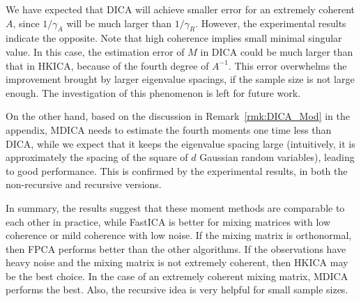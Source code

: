 \documentclass[jmlr]{article}
\theoremstyle{definition}
\begin{document}
We have expected that DICA will achieve smaller error for an extremely coherent $A$, since $1/\gamma_A$ will be much larger than $1/\gamma_R$. 
However, the experimental results indicate the opposite. 
Note that high coherence implies small minimal singular value.
In this case, the estimation error of $M$ in DICA could be much larger than that in HKICA, because of the fourth degree of $A^{-1}$.
This error overwhelms the improvement brought by larger eigenvalue
spacings, if the sample size is not large enough.
The investigation of this phenomenon is left for future work.

On the other hand, based on the discussion in Remark~\ref{rmk:DICA_Mod} in the appendix, 
MDICA needs to estimate the fourth moments one time less than
DICA, while we expect that it keeps the eigenvalue spacing large
(intuitively, it is approximately the spacing of the square of $d$ Gaussian random variables), leading to good performance.
This is confirmed by the experimental results, in both the non-recursive and recursive versions.

In summary, the results suggest that these moment methods are comparable to each other in practice,
while FastICA  is better for mixing matrices with low coherence or mild coherence with low noise.
If the mixing matrix is orthonormal, then FPCA performs better than
the other algorithms.
If the observations have heavy noise and the mixing matrix is not extremely coherent, then HKICA may be the best choice.
In the case of an extremely coherent mixing matrix, MDICA performs the
best. Also, the recursive idea is very helpful for small sample sizes.





\newpage 




\end{document}
